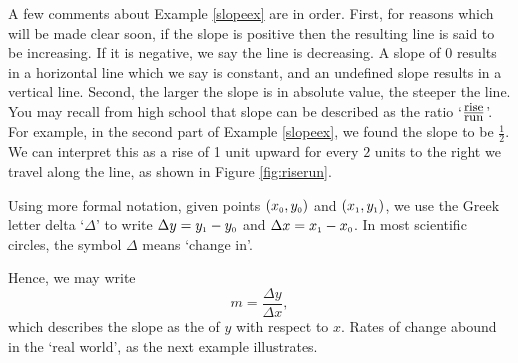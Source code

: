 A few comments about Example \ref{slopeex} are in order.  First, for reasons which will be made clear soon, if the slope is positive then the resulting line is said to be increasing.  If it is negative, we say the line is decreasing.  A slope of $0$ results in a horizontal line which we say is constant, and an undefined slope results in a vertical line. Second, the larger the slope is in absolute value, the steeper the line.  You may recall from high school that slope can be described as the ratio `$\frac{\mbox{\small rise}}{\mbox{\small run}}$'.  For example, in the second part of Example \ref{slopeex}, we found the slope to be $\frac{1}{2}$.  We can interpret this as a rise of 1 unit upward for every $2$ units to the right we travel along the line, as shown in Figure \ref{fig:riserun}.



Using more formal notation, given points $\left(x_{\mbox{\tiny$0$}}, y_{\mbox{\tiny$0$}}\right)$ and $\left(x_{\mbox{\tiny$1$}}, y_{\mbox{\tiny$1$}}\right)$, we use the Greek letter delta `$\Delta$' to write $\Delta y = y_{\mbox{\tiny$1$}} - y_{\mbox{\tiny$0$}}$ and $\Delta x = x_{\mbox{\tiny$1$}} - x_{\mbox{\tiny$0$}}$.  In most scientific circles, the symbol $\Delta$ means `change in'.  

\smallskip

Hence, we may write \[ m = \dfrac{\Delta y}{\Delta x},\] which describes the slope as the  of $y$ with respect to $x$.  Rates of change abound in the `real world', as the next example illustrates.

